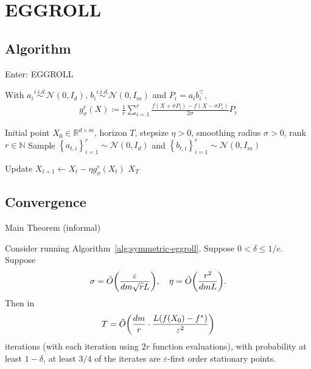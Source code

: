 \documentclass[10pt]{beamer}
\def \ve{\varepsilon}
\newcommand{\1}{\mathbbm{1}}
\renewcommand{\set}[1]{\left\{#1\right\}}
\begin{document}
\section{EGGROLL}
\subsection{Algorithm}
\begin{frame}{Enter: EGGROLL}
    \begin{definition}
        With $a_i \overset{i.i.d.}{\sim} \mathcal N(0, I_d)$, $b_i \overset{i.i.d.}{\sim} \mathcal N(0, I_m)$ and $P_i = a_ib_i^\top$,
        \begin{align*}
            g_\sigma^{r}(X) \coloneqq \frac 1r \sum_{i=1}^r \frac{f(X + \sigma P_{i}) - f(X - \sigma P_{i})}{2\sigma} P_{i}
        \end{align*}
    \end{definition}

    \begin{algorithm}[H]
    \caption{Rank-\(r\) Symmetric EGGROLL}
    \label{alg:symmetric-eggroll}
    \begin{algorithmic}
        \Require Initial point \(X_0 \in \mathbb R^{d\times m}\), horizon \(T\), stepsize \(\eta>0\), smoothing radius \(\sigma>0\), rank \(r\in \mathbb N\)
            \State Sample $\set{a_{t,i}}_{i=1}^r \sim \mathcal N(0,I_d)$ and $\set{b_{t,i}}_{i=1}^r \sim \mathcal N(0,I_m)$
                
            \State Update $X_{t+1}
                \gets
                X_t-\eta g_\sigma^r(X_t)$
        \EndFor
        \State \Return \(X_T\)
    \end{algorithmic}
    \end{algorithm}
\end{frame}

\subsection{Convergence}
\begin{frame}{Main Theorem (informal)}
    \begin{theorem}
        Consider running Algorithm~\ref{alg:symmetric-eggroll}. Suppose $0 < \delta \leq 1/e$. Suppose
        \begin{align*}
            \sigma = \tilde{O}\qty(\frac{\ve}{dm\sqrt{r}L}), \quad \eta = \tilde{O}\qty(\frac{r^2}{dmL}).
        \end{align*}
        Then in
        \begin{align*}
            T = \tilde{O}\qty(\frac{dm}{r} \cdot \frac{L(f(X_0) - f^*)}{\ve^2})
        \end{align*}
        iterations (with each iteration using $2r$ function evaluations), with probability at least $1-\delta$, at least $3/4$ of the iterates are $\ve$-first order stationary points. 
    \end{theorem}
\end{frame}
\end{document}
